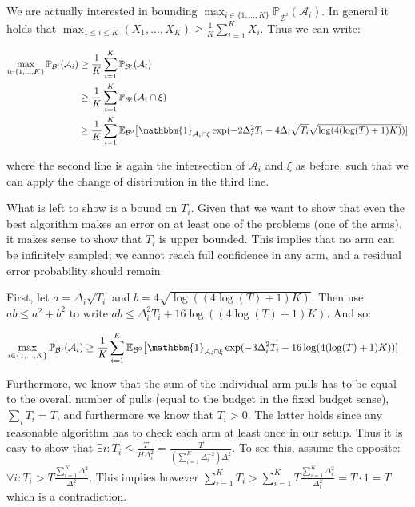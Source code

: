\documentclass[11pt,]{article}
\begin{document}
We are actually interested in bounding
\(\max_{i \in \{1,\dots,K\}} \mathbb{P}_{\mathcal{B}^i}(\mathcal{A}_i)\).
In general it holds that
\(\max_{1 \leq i \leq K} (X_1, \dots, X_K) \geq \frac{1}{K}\sum_{i=1}^K X_i\).
Thus we can write:

\begin{align*}
\max_{i \in \{1,\dots,K\}} \mathbb{P}_{\mathcal{B}^i}(\mathcal{A}_i) & \geq \frac{1}{K} \sum_{i=1}^{K} \mathbb{P}_{\mathcal{B}^i}(\mathcal{A}_i) \\
& \geq \frac{1}{K} \sum_{i=1}^{K} \mathbb{P}_{\mathcal{B}^i}(\mathcal{A}_i \cap \xi) \\
& \geq \frac{1}{K} \sum_{i=1}^{K} \mathbb{E}_{\mathcal{B}^0} \big[\mathbbm{1}_{\mathcal{A}_i \cap \xi} \exp (- 2 \Delta_i^2 T_i - 4 \Delta_i \sqrt{T_i} \sqrt{\log(4(\log(T)+1)K)}) ]
\end{align*}

where the second line is again the intersection of \(\mathcal{A}_i\) and
\(\xi\) as before, such that we can apply the change of distribution in
the third line.

What is left to show is a bound on \(T_i\). Given that we want to show
that even the best algorithm makes an error on at least one of the
problems (one of the arms), it makes sense to show that \(T_i\) is upper
bounded. This implies that no arm can be infinitely sampled; we cannot
reach full confidence in any arm, and a residual error probability
should remain.

First, let \(a = \Delta_i \sqrt{T_i}\) and
\(b = 4\sqrt{\log((4\log(T)+1)K)}\). Then use \(ab \leq a^2 + b^2\) to
write \(ab \leq \Delta_i^2 T_i + 16\log((4\log(T)+1)K)\). And so:

\begin{align*}
\max_{i \in \{1,\dots,K\}} \mathbb{P}_{\mathcal{B}^i}(\mathcal{A}_i) & \geq \frac{1}{K} \sum_{i=1}^{K} \mathbb{E}_{\mathcal{B}^0} \big[\mathbbm{1}_{\mathcal{A}_i \cap \xi} \exp (- 3 \Delta_i^2 T_i - 16 \log(4(\log(T)+1)K)) ]
\end{align*}

Furthermore, we know that the sum of the individual arm pulls has to be
equal to the overall number of pulls (equal to the budget in the fixed
budget sense), \(\sum_i T_i = T\), and furthermore we know that
\(T_i>0\). The latter holds since any reasonable algorithm has to check
each arm at least once in our setup. Thus it is easy to show that
\(\exists i: T_i \leq \frac{T}{H \Delta_i^2} = \frac{T}{(\sum_{i=1}^{K} \Delta_i^{-2}) \Delta_i^2}\).
To see this, assume the opposite:
\(\forall i: T_i > T \frac{\sum_{i=1}^K \Delta_i^2}{\Delta_i^2}\). This
implies however
\(\sum_{i=1}^K T_i > \sum_{i=1}^K T \frac{\sum_{i=1}^K \Delta_i^2}{\Delta_i^2} = T \cdot 1 = T\)
which is a contradiction.
\end{document}
